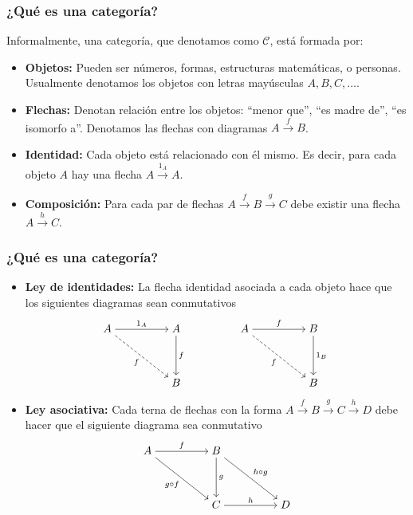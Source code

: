 \documentclass[10pt, aspectratio = 43,usenames,dvipsnames]{beamer}
\begin{document}
	\begin{frame}[t]
		\frametitle{¿Qué es una categoría?}
		Informalmente, una categoría, que denotamos como $\mathcal{C}$, está formada por:
		\begin{itemize}
			\item \textbf{Objetos:} Pueden ser números, formas, estructuras matemáticas, o personas. Usualmente denotamos los objetos con letras mayúsculas $A,B,C,\ldots$.
			\item \textbf{Flechas:} Denotan relación entre los objetos: ``menor que'', ``es madre de'', ``es isomorfo a''. Denotamos las flechas con diagramas $A\overset{f}{\longrightarrow}B$.
			\item \textbf{Identidad:} Cada objeto está relacionado con él mismo. Es decir, para cada objeto $A$ hay una flecha $A\overset{1_{A}}{\longrightarrow}A$.
			\item \textbf{Composición:} Para cada par de flechas $A\overset{f}{\longrightarrow}B\overset{g}{\longrightarrow}C$
			debe existir una flecha $A\overset{h}{\longrightarrow}C$.
		\end{itemize}
	\end{frame}

	\begin{frame}[t]
		\frametitle{¿Qué es una categoría?}
		\begin{itemize}
			\item \textbf{Ley de identidades:} La flecha identidad asociada a cada objeto hace que los siguientes diagramas sean conmutativos
			\[\begin{tikzcd}[ampersand replacement=\&,cramped]
				A \&\& A \&\& A \&\& B \\
				\\
				\&\& B \&\&\&\& B
				\arrow["{1_{A}}", from=1-1, to=1-3]
				\arrow["f"', dashed, from=1-1, to=3-3]
				\arrow["f", from=1-3, to=3-3]
				\arrow["f", from=1-5, to=1-7]
				\arrow["f"', dashed, from=1-5, to=3-7]
				\arrow["{1_{B}}", from=1-7, to=3-7]
			\end{tikzcd}\]
			\item \textbf{Ley asociativa:} Cada terna de flechas con la forma $A\overset{f}{\longrightarrow}B\overset{g}{\longrightarrow}C\overset{h}{\longrightarrow}D$ debe hacer que el siguiente diagrama sea conmutativo
			\[\begin{tikzcd}[ampersand replacement=\&,cramped]
				A \&\& B \\
				\\
				\&\& C \&\& D
				\arrow["f", from=1-1, to=1-3]
				\arrow["{g\circ f}"', from=1-1, to=3-3]
				\arrow["g", from=1-3, to=3-3]
				\arrow["{h\circ g}", from=1-3, to=3-5]
				\arrow["h", from=3-3, to=3-5]
			\end{tikzcd}\]
		\end{itemize}
	\end{frame}
\end{document}
